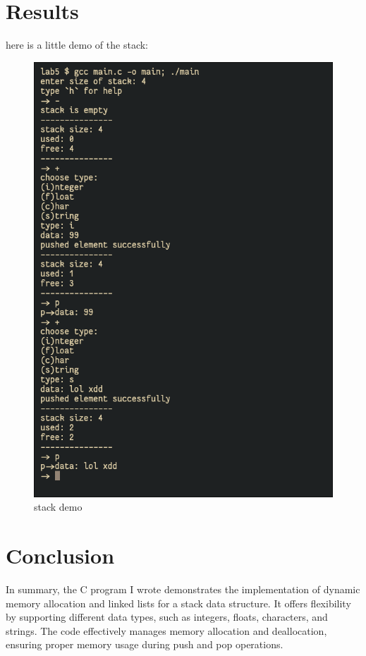 \documentclass[12pt]{article}
\begin{document}
\pagebreak
\section*{Results}
\hspace{0.8cm}
here is a little demo of the stack:
\begin{figure}[!h]
  \centering
  \includegraphics[width=5in]{stack_demo.png}
  \caption{stack demo}
\end{figure}
\pagebreak

\section*{Conclusion}
\hspace{0.8cm}
In summary, the C program I wrote demonstrates the implementation of dynamic memory allocation and linked lists for a stack data structure. It offers flexibility by supporting different data types, such as integers, floats, characters, and strings. The code effectively manages memory allocation and deallocation, ensuring proper memory usage during push and pop operations.
\end{document}
